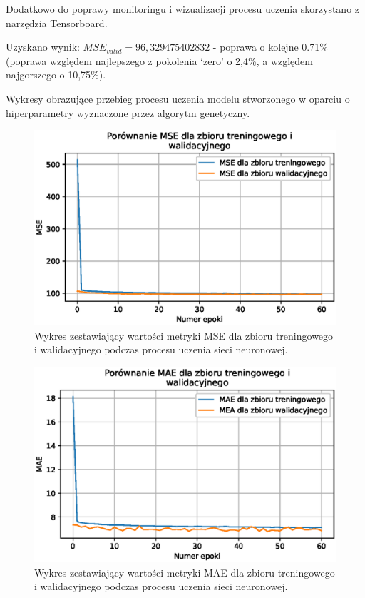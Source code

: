 \documentclass[a4paper,12pt]{article}
\numberwithin{figure}{section}
\begin{document}
    \bigskip

    Dodatkowo do poprawy monitoringu i wizualizacji procesu uczenia skorzystano z narzędzia Tensorboard.

    \bigskip

    Uzyskano wynik: \textbf{$MSE_{valid} = 96,329475402832$} - poprawa o kolejne 0.71\% (poprawa względem najlepszego z pokolenia `zero' o 2,4\%, a względem najgorszego o 10,75\%).

    \bigskip

    Wykresy obrazujące przebieg procesu uczenia modelu stworzonego w oparciu o hiperparametry wyznaczone przez algorytm genetyczny.

    \bigskip

    \begin{figure}[H]
        \centering
        \includegraphics[width=\textwidth]{f_m_mse_train_valid}
        \caption{Wykres zestawiający wartości metryki MSE dla zbioru treningowego i walidacyjnego podczas procesu uczenia sieci neuronowej.}
        \label{fig:f_m_mse_train_valid}
    \end{figure}

    \smallskip

    \begin{figure}[H]
        \centering
        \includegraphics[width=\textwidth]{f_m_mae_train_valid}
        \caption{Wykres zestawiający wartości metryki MAE dla zbioru treningowego i walidacyjnego podczas procesu uczenia sieci neuronowej.}
        \label{fig:f_m_mae_train_valid}
    \end{figure}
\end{document}
